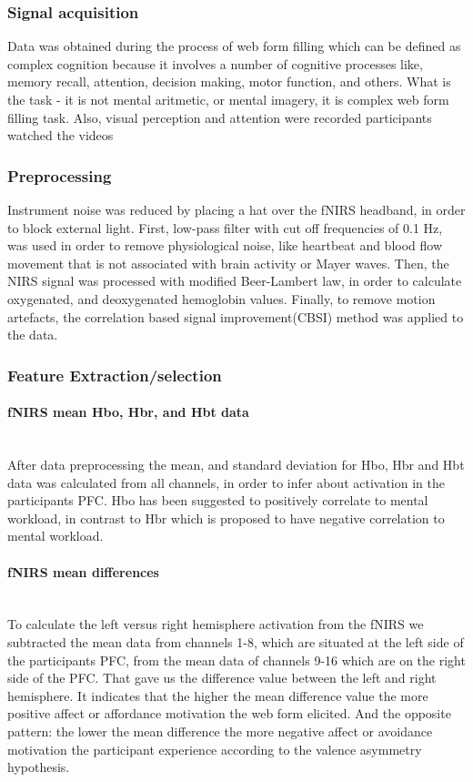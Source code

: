\documentclass[a4paper]{report}
\begin{document}
			\subsubsection{Signal acquisition}
			Data was obtained during the process of web form filling which can be defined as complex cognition because it involves a number of cognitive processes like, memory recall, attention, decision making, motor function, and others. What is the task - it is not mental aritmetic, or mental imagery, it is complex web form filling task.
			Also, visual perception and attention were recorded participants watched the videos 
			\subsubsection{Preprocessing}
			Instrument noise was reduced by placing a hat over the fNIRS headband, in order to block external light.
			First, low-pass filter with cut off frequencies of 0.1 Hz, was used in order to remove physiological noise, like heartbeat and blood flow movement that is not associated with brain activity or Mayer waves.
			Then, the NIRS signal was processed with modified Beer-Lambert law\cite{cope1988system}, in order to calculate oxygenated, and deoxygenated hemoglobin values.
			Finally, to remove motion artefacts, the correlation based signal improvement(CBSI)\cite{cui2010functional} method was applied to the data.
			\subsubsection{Feature Extraction/selection}
				\paragraph{fNIRS mean Hbo, Hbr, and Hbt data}\leavevmode\\
				After data preprocessing the mean, and standard deviation for Hbo, Hbr and Hbt data was calculated from all channels, in order to infer about activation in the participants PFC. Hbo has been suggested to positively correlate to mental workload, in contrast to Hbr which is proposed to have negative correlation to mental workload.

				\paragraph{fNIRS mean differences}\leavevmode\\
				To calculate the left versus right hemisphere activation from the fNIRS we subtracted the mean data from channels 1-8, which are situated at the left side of the participants PFC, from the mean data of channels 9-16 which are on the right side of the PFC. That gave us the difference value between the left and right hemisphere. It indicates that the higher the mean difference value the more positive affect or affordance motivation the web form elicited. And the opposite pattern: the lower the mean difference the more negative affect or avoidance motivation the participant experience according to the valence asymmetry hypothesis.
				
\end{document}
